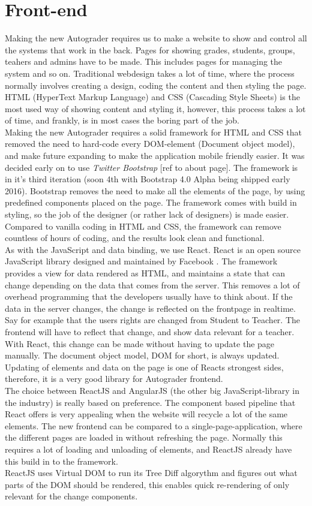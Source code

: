 \section{Front-end}
Making the new Autograder requires us to make a website to show and control all the systems that work in the back. Pages for showing grades, students, groups, teahers and admins have to be made. This includes pages for managing the system and so on. Traditional webdesign takes a lot of time, where the process normally involves creating a design, coding the content and then styling the page. HTML (HyperText Markup Language) and CSS (Cascading Style Sheets) is the most used way of showing content and styling it, however, this process takes a lot of time, and frankly, is in most cases the boring part of the job.
\\Making the new Autograder requires a solid framework for HTML and CSS that removed the need to hard-code every DOM-element (Document object model), and make future expanding to make the application mobile friendly easier. It was decided early on to use \textit{Twitter Bootstrap} [ref to about page]. The framework is in it's third iteration (soon 4th with Bootstrap 4.0 Alpha being shipped early 2016). Bootstrap removes the need to make all the elements of the page, by using predefined components placed on the page. The framework comes with build in styling, so the job of the designer (or rather lack of designers) is made easier. Compared to vanilla coding in HTML and CSS, the framework can remove countless of hours of coding, and the results look clean and functional.
\\As with the JavaScript and data binding, we use React. React is an open source JavaScript library designed and maintained by Facebook . The framework provides a view for data rendered as HTML, and maintains a state that can change depending on the data that comes from the server. This removes a lot of overhead programming that the developers usually have to think about. If the data in the server changes, the change is reflected on the frontpage in realtime. Say for example that the users rights are changed from Student to Teacher. The frontend will have to reflect that change, and show data relevant for a teacher. With React, this change can be made without having to update the page manually. The document object model, DOM for short, is always updated. Updating of elements and data on the page is one of Reacts strongest sides, therefore, it is a very good library for Autograder frontend.
\\The choice between ReactJS and AngularJS (the other big JavaScript-library in the industry) is really based on preference. The component based pipeline that React offers is very appealing when the website will recycle a lot of the same elements. The new frontend can be compared to a single-page-application, where the different pages are loaded in without refreshing the page. Normally this requires a lot of loading and unloading of elements, and ReactJS already have this build in to the framework.
\\ReactJS uses Virtual DOM to run its Tree Diff algorythm and figures out what parts of the DOM should be rendered, this enables quick re-rendering of only relevant for the change components.


